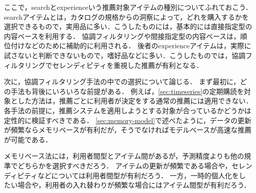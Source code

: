 ここで，searchとexperienceいう推薦対象アイテムの種別\cite{ej:053}についてふれておこう．
searchアイテムとは，カタログの規格からの洞察によって，どれを購入するかを選択できるもので，実用品に多い．こうしたものには，基本的には直接指定型の内容ベースを利用する．
協調フィルタリングや間接指定型の内容ベースは，順位付けなどのために補助的に利用される．
後者のexperienceアイテムは，実際に試さないと判断できないもので，嗜好品などに多い．こうしたものでは，協調フィルタリングでセレンディピティを重視した推薦が有利となる．

次に，協調フィルタリング手法の中での選択について論じる．
まず最初に，どの手法も背後にいろいろな前提がある．
例えば，\ref{sec:timeseries}の定期購読を対象とした方法は，推薦ごとに利用者が決定をする通常の推薦には適用できない．
各手法の前提に，推薦システムを適用しようとする対象が合っているかどうかは定性的に検証すべきである．
\ref{sec:memory-model}で述べたように，データの更新が頻繁ならメモリベースが有利だが，そうでなければモデルベースが高速な推薦が可能である．

メモリベース法には，利用者間型とアイテム間があるが，予測精度よりも他の規準でどちらかを選択すべきだろう．
アイテムの更新が頻繁である場合や，セレンディピティなどについては利用者間型が有利だろう．
一方，一時的個人化をしたい場合や，利用者の入れ替わりが頻繁な場合にはアイテム間型が有利だろう．

